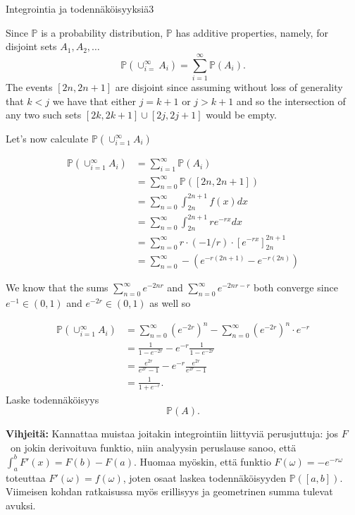\documentclass[11pt,a4paper]{amsart}
\newcommand{\1}{\mathbf{1}}
\renewcommand{\P}{\mathbb P}
\begin{document}
\begin{Exercises}{Integrointia ja todennäköisyyksiä}{3}
\begin{enumerate}
    Since $ \P$ is a probability distribution, $ \P$ has additive properties, namely, for disjoint
    sets $ A_{1} , A_{2}, \dots $
    \[
	\P(\cup_{i=}^{\infty} A_{i}  ) = \sum_{i=1}^{\infty} \P(A_{i} )   
    .\] 
    The events $ [2n, 2n+1]$ are disjoint since assuming without loss of generality that $ k< j$ 
    we have that either $ j = k+1$ or $ j > k+1 $ and so the intersection
    of any two such sets $ [2k, 2k+1] \cup [2j, 2j+1] $ would be empty. 

    Let's now calculate $ \P( \cup_{i=1}^{\infty} A_{i} )$

    \begin{align*}
	\P( \cup_{i=1}^{\infty} A_{i} ) &= \sum_{i=1}^{\infty} \P(A_{i} )\\
					&= \sum_{n=0}^{\infty} \P([2n,2n+1])\\
					&= \sum_{n=0}^{\infty} \int_{2n}^{2n+1} f(x) dx\\
					&= \sum_{n=0}^{\infty} \int_{2n}^{2n+1} r e^{-rx} dx\\
					&= \sum_{n=0}^{\infty} r \cdot (-1/r) \cdot \left[ e^{-rx}
					\right]_{2n}^{2n+1} \\
					&= \sum_{n=0}^{\infty} - \left( e^{-r(2n+1)} - e^{-r (2n) }
				    \right) 
    \end{align*}

    We know that the sums $ \sum_{n=0}^{\infty} e^{-2nr} $ and $ \sum_{n=0}^{\infty} e^{-2nr -r} $
    both converge since $ e^{-1}  \in (0,1)$ and $ e^{-2r} \in (0,1)$ as well so 

    \begin{align*}
	\P( \cup_{i=1}^{\infty} A_{i} ) &= \sum_{n=0}^{\infty} (e^{-2r} )^{n} - \sum_{n=0}^{\infty}
	(e^{-2r})^{n} \cdot e^{-r} \\
					&= \frac{1}{1- e^{-2r} } - e^{-r} \frac{1}{1-e^{-2r} } \\
					&= \frac{e^{2r} }{e^{2r} -1} - e^{-r} \frac{e^{2r} }{e^{2r}
					-1} \\
					&= \frac{1}{1+ e^{-r} }.
    \end{align*}
Laske todennäköisyys
\[
\P(A).
\]
\end{enumerate}
{\bf Vihjeitä:} Kannattaa muistaa joitakin integrointiin liittyviä perusjuttuja: jos $F$ on jokin derivoituva funktio, niin analyysin peruslause sanoo, että $\int_a^b F'(x)=F(b)-F(a)$. Huomaa myöskin, että funktio $F(\omega)=-e^{-r\omega}$ toteuttaa $F'(\omega)=f(\omega)$, joten osaat laskea todennäköisyyden $\P([a,b])$. Viimeisen kohdan ratkaisussa myös erillisyys ja geometrinen summa tulevat avuksi.
\end{Exercises}
\end{document}
